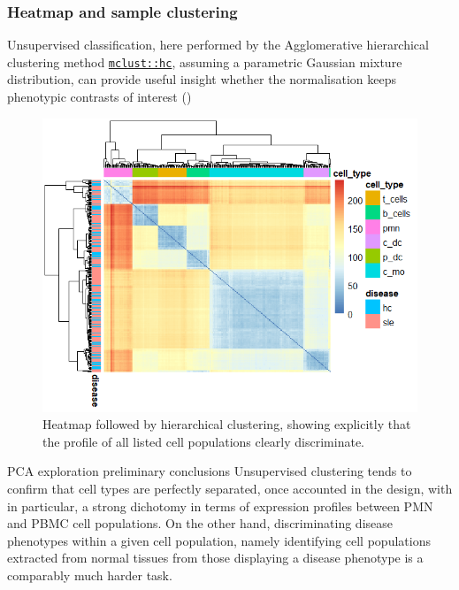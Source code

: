 \subsubsection{Heatmap and sample clustering} 
\label{heatmap-and-sample-clustering}

Unsupervised classification, here performed by the Agglomerative hierarchical clustering method \href{https://mclust-org.github.io/mclust/reference/hc.html}{\texttt{mclust::hc}}, assuming a parametric Gaussian mixture distribution, can provide useful insight whether the normalisation keeps phenotypic contrasts of interest () 

\begin{figure}

{\centering \includegraphics[width=0.95\linewidth]{./figures/heatmap_gse149050} 

}

\caption{Heatmap followed by hierarchical clustering, showing explicitly that the profile of all listed cell populations clearly discriminate.}\label{fig:sample-clustering}
\end{figure}

\begin{info}{PCA exploration preliminary conclusions}
Unsupervised clustering tends to confirm that cell types are perfectly separated, once accounted in the design, with in particular, a strong dichotomy in terms of expression profiles between PMN and PBMC cell populations. On the other hand, discriminating disease phenotypes within a given cell population, namely identifying cell populations extracted from normal tissues from those displaying a disease phenotype is a comparably much harder task.

\end{info}


